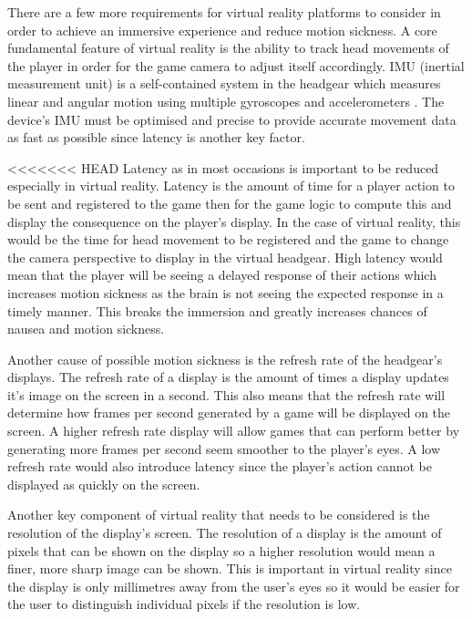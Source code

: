 There are a few more requirements for virtual reality platforms to consider in order to achieve an immersive experience and reduce motion sickness. A core fundamental feature of virtual reality is the ability to track head movements of the player in order for the game camera to adjust itself accordingly. IMU (inertial measurement unit) is a self-contained system in the headgear which measures linear and angular motion using multiple gyroscopes and accelerometers \cite{imu}. The device's IMU must be optimised and precise to provide accurate movement data as fast as possible since latency is another key factor.
\newline
\par
<<<<<<< HEAD
Latency as in most occasions is important to be reduced especially in virtual reality. Latency is the amount of time for a player action to be sent and registered to the game then for the game logic to compute this and display the consequence on the player's display. In the case of virtual reality, this would be the time for head movement to be registered and  the game to change the camera perspective to display in the virtual headgear. High latency would mean that the player will be seeing a delayed response of their actions which increases motion sickness as the brain is not seeing the expected response in a timely manner. This breaks the immersion and greatly increases chances of nausea and motion sickness.
\newline
\par
Another cause of possible motion sickness is the refresh rate of the headgear's displays. The refresh rate of a display is the amount of times a display updates it's image on the screen in a second. This also means that the refresh rate will determine how frames per second generated by a game will be displayed on the screen. A higher refresh rate display will allow games that can perform better by generating more frames per second seem smoother to the player's eyes. A low refresh rate would also introduce latency since the player's action cannot be displayed as quickly on the screen.
\newline
\par
Another key component of virtual reality that needs to be considered is the resolution of the display's screen. The resolution of a display is the amount of pixels that can be shown on the display so a higher resolution would mean a finer, more sharp image can be shown. This is important in virtual reality since the display is only millimetres away from the user's eyes so it would be easier for the user to distinguish individual pixels if the resolution is low.
